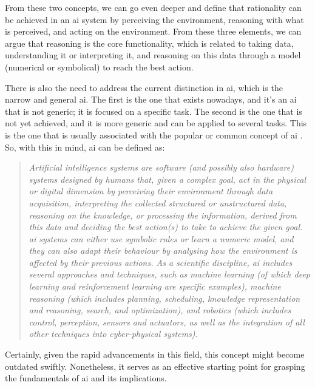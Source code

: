From these two concepts, we can go even deeper and define that rationality can be achieved in an \ac{ai} system by perceiving the environment, reasoning with what is perceived, and acting on the environment. From these three elements, we can argue that reasoning is the core functionality, which is related to taking data, understanding it or interpreting it, and reasoning on this data through a model (numerical or symbolical) to reach the best action.

There is also the need to address the current distinction in \ac{ai}, which is the narrow and general \ac{ai}. The first is the one that exists nowadays, and it's an \ac{ai} that is not generic; it is focused on a specific task. The second is the one that is not yet achieved, and it is more generic and can be applied to several tasks. This is the one that is usually associated with the popular or common concept of \ac{ai} \cite{DefinitionAIMain2019,DBLP:books/aw/RN2020}. So, with this in mind, \ac{ai} can be defined as:

\begin{quote}
    \textit{Artificial intelligence systems are software (and possibly also hardware) systems designed by humans that, given a complex goal, act in the physical or digital dimension by perceiving their environment through data acquisition, interpreting the collected structured or unstructured data, reasoning on the knowledge, or processing the information, derived from this data and deciding the best action(s) to take to achieve the given goal. \ac{ai} systems can either use symbolic rules or learn a numeric model, and they can also adapt their behaviour by analysing how the environment is affected by their previous actions. As a scientific discipline, \ac{ai} includes several approaches and techniques, such as machine learning (of which deep learning and reinforcement learning are specific examples), machine reasoning (which includes planning, scheduling, knowledge representation and reasoning, search, and optimization), and robotics (which includes control, perception, sensors and actuators, as well as the integration of all other techniques into cyber-physical systems).} \cite{DefinitionAIMain2019}
    \end{quote}
    
Certainly, given the rapid advancements in this field, this concept might become outdated swiftly. Nonetheless, it serves as an effective starting point for grasping the fundamentals of \ac{ai} and its implications.



